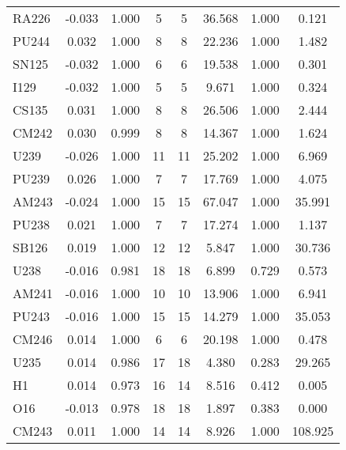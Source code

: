 \begin{tabular}{|l|ccccccc|}
RA226 & -0.033 & 1.000 & 5 & 5 & 36.568 & 1.000 & 0.121\\
PU244 & 0.032 & 1.000 & 8 & 8 & 22.236 & 1.000 & 1.482\\
SN125 & -0.032 & 1.000 & 6 & 6 & 19.538 & 1.000 & 0.301\\
I129 & -0.032 & 1.000 & 5 & 5 & 9.671 & 1.000 & 0.324\\
CS135 & 0.031 & 1.000 & 8 & 8 & 26.506 & 1.000 & 2.444\\
CM242 & 0.030 & 0.999 & 8 & 8 & 14.367 & 1.000 & 1.624\\
U239 & -0.026 & 1.000 & 11 & 11 & 25.202 & 1.000 & 6.969\\
PU239 & 0.026 & 1.000 & 7 & 7 & 17.769 & 1.000 & 4.075\\
AM243 & -0.024 & 1.000 & 15 & 15 & 67.047 & 1.000 & 35.991\\
PU238 & 0.021 & 1.000 & 7 & 7 & 17.274 & 1.000 & 1.137\\
SB126 & 0.019 & 1.000 & 12 & 12 & 5.847 & 1.000 & 30.736\\
U238 & -0.016 & 0.981 & 18 & 18 & 6.899 & 0.729 & 0.573\\
AM241 & -0.016 & 1.000 & 10 & 10 & 13.906 & 1.000 & 6.941\\
PU243 & -0.016 & 1.000 & 15 & 15 & 14.279 & 1.000 & 35.053\\
CM246 & 0.014 & 1.000 & 6 & 6 & 20.198 & 1.000 & 0.478\\
U235 & 0.014 & 0.986 & 17 & 18 & 4.380 & 0.283 & 29.265\\
H1 & 0.014 & 0.973 & 16 & 14 & 8.516 & 0.412 & 0.005\\
O16 & -0.013 & 0.978 & 18 & 18 & 1.897 & 0.383 & 0.000\\
CM243 & 0.011 & 1.000 & 14 & 14 & 8.926 & 1.000 & 108.925\\
\hline
\end{tabular}